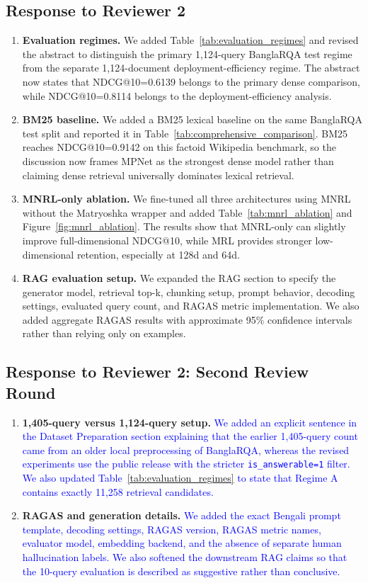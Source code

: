 \documentclass[manuscript,screen,review]{acmart}
\newcommand{\revise}[1]{\textcolor{blue}{#1}}
\begin{document}
\subsection*{Response to Reviewer 2}
\begin{enumerate}
    \item \textbf{Evaluation regimes.} We added Table~\ref{tab:evaluation_regimes} and revised the abstract to distinguish the primary 1,124-query BanglaRQA test regime from the separate 1,124-document deployment-efficiency regime. The abstract now states that NDCG@10=0.6139 belongs to the primary dense comparison, while NDCG@10=0.8114 belongs to the deployment-efficiency analysis.
    \item \textbf{BM25 baseline.} We added a BM25 lexical baseline on the same BanglaRQA test split and reported it in Table~\ref{tab:comprehensive_comparison}. BM25 reaches NDCG@10=0.9142 on this factoid Wikipedia benchmark, so the discussion now frames MPNet as the strongest dense model rather than claiming dense retrieval universally dominates lexical retrieval.
    \item \textbf{MNRL-only ablation.} We fine-tuned all three architectures using MNRL without the Matryoshka wrapper and added Table~\ref{tab:mnrl_ablation} and Figure~\ref{fig:mnrl_ablation}. The results show that MNRL-only can slightly improve full-dimensional NDCG@10, while MRL provides stronger low-dimensional retention, especially at 128d and 64d.
    \item \textbf{RAG evaluation setup.} We expanded the RAG section to specify the generator model, retrieval top-k, chunking setup, prompt behavior, decoding settings, evaluated query count, and RAGAS metric implementation. We also added aggregate RAGAS results with approximate 95\% confidence intervals rather than relying only on examples.
\end{enumerate}

\subsection*{Response to Reviewer 2: Second Review Round}
\begin{enumerate}
    \item \textbf{1,405-query versus 1,124-query setup.} \revise{We added an explicit sentence in the Dataset Preparation section explaining that the earlier 1,405-query count came from an older local preprocessing of BanglaRQA, whereas the revised experiments use the public release with the stricter \texttt{is\_answerable=1} filter. We also updated Table~\ref{tab:evaluation_regimes} to state that Regime A contains exactly 11,258 retrieval candidates.}
    \item \textbf{RAGAS and generation details.} \revise{We added the exact Bengali prompt template, decoding settings, RAGAS version, RAGAS metric names, evaluator model, embedding backend, and the absence of separate human hallucination labels. We also softened the downstream RAG claims so that the 10-query evaluation is described as suggestive rather than conclusive.}
\end{enumerate}
\end{document}

